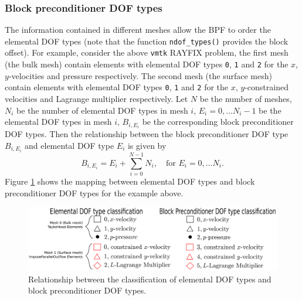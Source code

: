 \subsubsection{Block preconditioner DOF types}
The information contained in different meshes allow the BPF to order the elemental
DOF types (note that the function \texttt{ndof\_\allowbreak types()} provides 
the block offset). For example, consider the above \texttt{vmtk} RAYFIX problem, 
the first mesh (the bulk mesh) contain elements with elemental DOF types 
\texttt{0}, \texttt{1} and \texttt{2} for the $x$, $y$-velocities and pressure
respectively. The second mesh (the surface mesh) contain elements with elemental
DOF types \texttt{0}, \texttt{1} and \texttt{2} for the $x$, $y$-constrained 
velocities and Lagrange multiplier respectively. Let $N$ be the 
number of meshes, $N_i$ be the number of elemental DOF types in mesh $i$,
$E_i = 0, \ldots N_i - 1$ be the elemental DOF types in mesh $i$, $B_{i,E_i}$ 
be the corresponding block preconditioner DOF types. Then the relationship 
between the block preconditioner DOF type $B_{i,E_i}$ and elemental DOF type
$E_i$ is given by
\begin{equation*}
  B_{i,E_i} = E_i + \sum_{i=0}^{N - 1} N_i, \quad \mbox{for } E_i = 0,\ldots N_i.
\end{equation*}
Figure \ref{fig:elemental_to_block_dof_classification} shows the mapping between
elemental DOF types and block preconditioner DOF types for the example above.
\begin{figure}[H]
\centering
\includegraphics[width=1\textwidth]{./pic/elemental_to_block_dof_classification.pdf}
\caption{Relationship between the classification of elemental DOF types and block
         preconditioner DOF types.}
\label{fig:elemental_to_block_dof_classification}
\end{figure}


